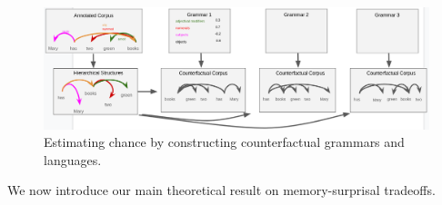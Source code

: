 %
%







\begin{figure}
\centering
\includegraphics[width=\textwidth]{figures-gdrive/counterfactual-languages.png}
	\caption{ Estimating chance by constructing counterfactual grammars and languages.}\label{fig:grammars}
\end{figure}










We now introduce our main theoretical result on memory-surprisal tradeoffs.






